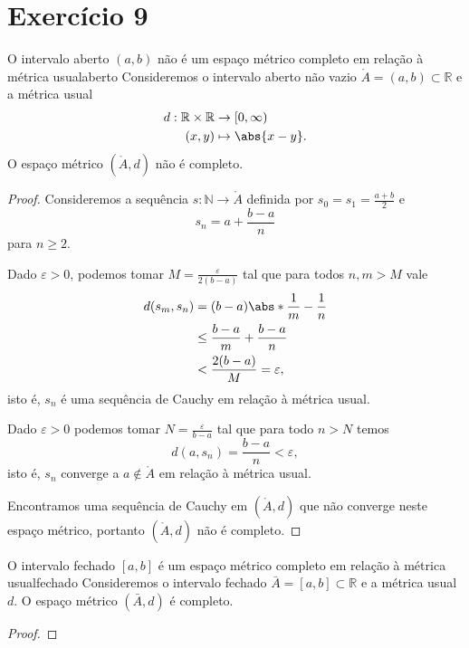 \section*{Exercício 9}

\begin{proposition}{O intervalo aberto \((a,b)\) não é um espaço métrico completo em relação à métrica usual}{aberto}
    Consideremos o intervalo aberto não vazio \(\mathring{A} = (a,b) \subset \mathbb{R}\) e a métrica usual
    \begin{align*}
        d : \mathbb{R} \times \mathbb{R} &\to [0, \infty)\\
                                   (x,y) &\mapsto \abs{x - y}.
    \end{align*}
    O espaço métrico \((\mathring{A}, d)\) não é completo.
\end{proposition}
\begin{proof}
    Consideremos a sequência \(s : \mathbb{N} \to \mathring{A}\) definida por \(s_0 = s_1 = \frac{a+b}{2}\) e
    \begin{equation*}
        s_n = a + \frac{b - a}{n}
    \end{equation*}
    para \(n \geq 2\).

    Dado \(\varepsilon > 0\), podemos tomar \(M = \frac{\varepsilon}{2(b - a)}\) tal que para todos \(n,m > M\) vale
    \begin{align*}
        d(s_m, s_n) &= (b - a) \abs*{\frac{1}{m} - \frac{1}{n}}\\
                    &\leq \frac{b - a}{m} + \frac{b - a}{n}\\
                    &< \frac{2(b - a)}{M} = \varepsilon,
    \end{align*}
    isto é, \(s_n\) é uma sequência de Cauchy em relação à métrica usual.


    Dado \(\varepsilon > 0\) podemos tomar \(N = \frac{\varepsilon}{b - a}\) tal que para todo \(n > N\) temos
    \begin{equation*}
        d(a, s_n) = \frac{b - a}{n} < \varepsilon,
    \end{equation*}
    isto é, \(s_n\) converge a \(a \notin \mathring{A}\) em relação à métrica usual.

    Encontramos uma sequência de Cauchy em \((\mathring{A}, d)\) que não converge neste espaço métrico, portanto \((\mathring{A},d)\) não é completo.
\end{proof}

\begin{proposition}{O intervalo fechado \([a,b]\) é um espaço métrico completo em relação à métrica usual}{fechado}
    Consideremos o intervalo fechado \(\bar{A} = [a,b] \subset \mathbb{R}\) e a métrica usual \(d\). O espaço métrico \((\bar{A}, d)\) é completo.
\end{proposition}
\begin{proof}

\end{proof}
